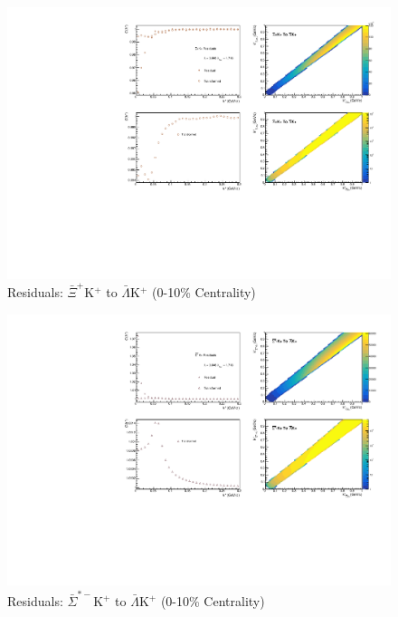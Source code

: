 \documentclass[../AnalysisNoteJBuxton.tex]{subfiles}
\begin{document}
\begin{figure}[h]
  \centering
  \includegraphics[width=\textwidth]{9_AdditionalFigures/Figures/Residuals/ALamKchP/Residuals_ALamKchP_0010_AXiKchP_MomResCrctn_NonFlatBgdCrctn_10Res_PrimMaxDecay4fm_UsingXiDataAndCoulombOnly.pdf}
  \caption[Residuals: $\bar{\Xi}^{+}$K$^{+}$ to $\bar{\Lambda}$K$^{+}$ (0-10\% Centrality)]{Residuals: $\bar{\Xi}^{+}$K$^{+}$ to $\bar{\Lambda}$K$^{+}$ (0-10\% Centrality)}
  \label{fig:Res_ALamKchP_0010_AXiCKchP}
\end{figure}


\begin{figure}[h]
  \centering
  \includegraphics[width=\textwidth]{9_AdditionalFigures/Figures/Residuals/ALamKchP/Residuals_ALamKchP_0010_ASigStMKchP_MomResCrctn_NonFlatBgdCrctn_10Res_PrimMaxDecay4fm_UsingXiDataAndCoulombOnly.pdf}
  \caption[Residuals: $\bar{\Sigma}^{*-}$K$^{+}$ to $\bar{\Lambda}$K$^{+}$ (0-10\% Centrality)]{Residuals: $\bar{\Sigma}^{*-}$K$^{+}$ to $\bar{\Lambda}$K$^{+}$ (0-10\% Centrality)}
  \label{fig:Res_ALamKchP_0010_ASigStMKchP}
\end{figure}
\end{document}
